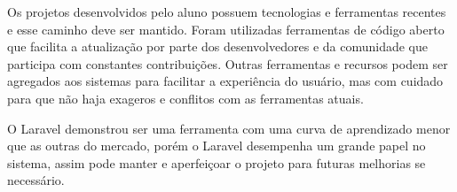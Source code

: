 \documentclass[
  12pt,            %
  openany,
  oneside,
  a4paper,         %
  english,      %
  brazil
]{article}
\numberwithin{figure}{section}
\numberwithin{table}{section}
\begin{document}
Os projetos desenvolvidos pelo aluno possuem tecnologias e ferramentas recentes e esse caminho deve ser mantido. Foram utilizadas ferramentas de código aberto que facilita a atualização por parte dos desenvolvedores e da comunidade que participa com constantes contribuições. Outras ferramentas e recursos podem ser agregados aos sistemas para facilitar a experiência do usuário, mas com cuidado para que não haja exageros e conflitos com as ferramentas atuais.

O Laravel demonstrou ser uma ferramenta com uma curva de aprendizado menor que as outras do mercado, porém o Laravel desempenha um grande papel no sistema, assim pode manter e aperfeiçoar o projeto para futuras melhorias se necessário.


\clearpage
{}
{}
\renewcommand\refname{REFERÊNCIAS BIBLIOGRÁFICAS}


\end{document}
